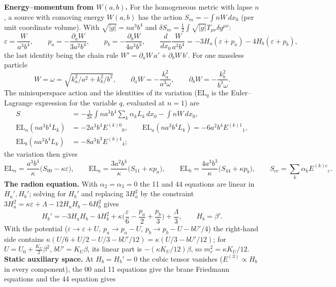 \documentclass[10pt,a4paper]{article}
\begin{document}
\textbf{Energy–momentum from $W(a,b)$.} For the homogeneous metric with lapse $n$, a source with comoving energy $W(a,b)$ has the action $S_m=-\int nW\,dx_0$ (per unit coordinate volume). With $\sqrt{|g|}=na^3b^4$ and $\delta S_m=\tfrac12\int\sqrt{|g|}T_{\mu\nu}\delta g^{\mu\nu}$:
\begin{equation*}
\varepsilon=\frac{W}{a^3b^4},\qquad p_a=-\frac{\partial_aW}{3a^2b^4},\qquad p_b=-\frac{\partial_bW}{4a^3b^3},\qquad \frac{d}{dx_0}\frac{W}{a^3b^4}=-3H_a(\varepsilon+p_a)-4H_b(\varepsilon+p_b),
\end{equation*}
the last identity being the chain rule $W'=\partial_aW\,a'+\partial_bW\,b'$. For one massless particle
\begin{equation*}
W=\omega=\sqrt{k_a^2/a^2+k_b^2/b^2},\qquad \partial_aW=-\frac{k_a^2}{a^3\omega},\qquad \partial_bW=-\frac{k_b^2}{b^3\omega}.
\end{equation*}
The minisuperspace action and the identities of its variation ($\mathrm{EL}_q$ is the Euler–Lagrange expression for the variable $q$, evaluated at $n=1$) are
\begin{align*}
S&=-\frac1{2\kappa}\int na^3b^4\sum_k\alpha_kL_k\,dx_0-\int nW\,dx_0, \\
\mathrm{EL}_n(na^3b^4L_k)&=-2a^3b^4E^{(k)0}{}_0,\qquad \mathrm{EL}_a(na^3b^4L_k)=-6a^2b^4E^{(k)1}{}_1, \\
\mathrm{EL}_b(na^3b^4L_k)&=-8a^3b^3E^{(k)4}{}_4;
\end{align*}
the variation then gives
\begin{equation*}
\mathrm{EL}_n=\frac{a^3b^4}\kappa\big(S_{00}-\kappa\varepsilon\big),\qquad \mathrm{EL}_a=\frac{3a^2b^4}\kappa\big(S_{11}+\kappa p_a\big),\qquad \mathrm{EL}_b=\frac{4a^3b^3}\kappa\big(S_{44}+\kappa p_b\big),\qquad S_{cc}=\sum_k\alpha_kE^{(k)c}{}_c .
\end{equation*}
\textbf{The radion equation.} With $\alpha_2=\alpha_3=0$ the 11 and 44 equations are linear in $H_a',H_b'$; solving for $H_b'$ and replacing $3H_a^2$ by the constraint $3H_a^2=\kappa\varepsilon+\Lambda-12H_aH_b-6H_b^2$ gives
\begin{equation*}
H_b'=-3H_aH_b-4H_b^2+\kappa\Big(\frac\varepsilon6-\frac{p_a}2+\frac{p_b}3\Big)+\frac\Lambda3,\qquad H_b=\beta'.
\end{equation*}
With the potential ($\varepsilon\to\varepsilon+U$, $p_a\to p_a-U$, $p_b\to p_b-U-bU'/4$) the right-hand side contains $\kappa(U/6+U/2-U/3-bU'/12)=\kappa(U/3-bU'/12)$; for $U=U_0+\tfrac{K_U}2\beta^2$, $bU'=K_U\beta$, its linear part is $-(\kappa K_U/12)\beta$, so $m_r^2=\kappa K_U/12$. \textbf{Static auxiliary space.} At $H_b=H_b'=0$ the cubic tensor vanishes ($E^{(3)}\propto H_b$ in every component), the 00 and 11 equations give the brane Friedmann equations and the 44 equation gives
\end{document}
